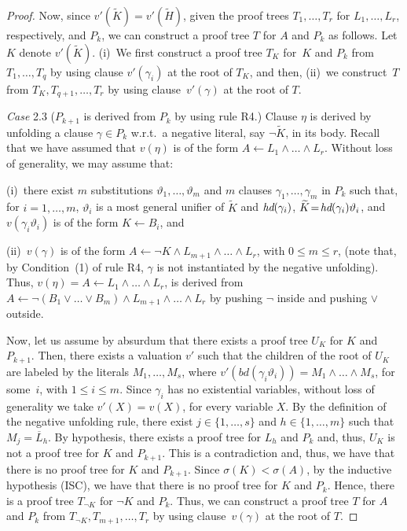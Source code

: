 \documentclass[english]{tlp}
\newcommand{\tH}{{\widetilde{H}}}
\newcommand{\tK}{{\widetilde{K}}}
\renewcommand{\mathit}{\displaystyle}
\newcommand{\Mathit}[1]{\mbox{\it #1}}
\begin{document}
\begin{proof}
Now, since $v'(\tK)\!=\!v'(\tH)$, given the proof trees 
$T_1,\ldots,T_r$ for $L_1,\ldots,L_r$, respectively, and $P_k$,
we can construct a proof tree $T$ for $A$ and $ P_k$ as follows.
Let $K$ denote $v'(\tK)$.
(i)~We first construct a proof tree $T_K$ for~$K$
 and $ P_k$ from $T_1,\ldots,T_q$ by using clause $v'(\gamma_i)$ at the root of $T_K$, and then,
(ii)~we construct~$T$ from $T_K,T_{q+1},\ldots,T_r$
by using clause~$v'(\gamma)$ at the root of $T$.

\medskip 

\noindent \emph{Case} 2.3 ($P_{k+1}$ is derived from $P_k$ by using
rule R4.)  Clause \( \eta  \) is derived by unfolding a clause
$\gamma\in  P_k$ w.r.t.~a negative literal, say $\neg \tK$, in its body. Recall that we have assumed that $v(\eta)$ is of the form $A
\leftarrow  L_{1} \wedge \ldots \wedge L_r$. Without loss
of generality, we may assume that: 

\noindent
(i)~there exist $m$ 
substitutions $\vartheta_1,\ldots,\vartheta_m$ and $m$ clauses $\gamma_1,\ldots,\gamma_m$ in $
P_k$ such that, for $i=1,\ldots,m$, $\vartheta_i$ is a most general
unifier of $\tK$ and $\Mathit{hd}(\gamma_i)$, $\tK\!=\!\Mathit{hd}(\gamma_i)\vartheta_i$,
and $v(\gamma_i\vartheta_i)$ is of the form
$K\leftarrow B_i$, and

\noindent
(ii)~$v(\gamma)$ is of the form $A
\leftarrow \neg K \wedge L_{m+1} \wedge \ldots \wedge L_r$, with
$0\leq m\leq r$, (note that, by Condition~(1) of rule R4, $\gamma$ is not
instantiated by the negative unfolding).
Thus, $v(\eta)=A
\leftarrow  L_{1} \wedge \ldots \wedge L_r$,  is derived 
from $A
\leftarrow \neg (B_1\vee \ldots \vee B_m) \wedge L_{m+1} \wedge \ldots \wedge L_r$
by pushing $\neg$ inside and pushing $\vee$ outside.


Now, let us assume by absurdum that there exists a proof tree $U_K$ for
$K$ and $P_{k+1}$. Then, there exists a valuation $v'$ such that the children of
the root of $U_K$ are labeled by the literals $M_1,\ldots,M_s$, where
$v'(\mathit{bd}(\gamma_i\vartheta_i))=M_1\wedge\ldots\wedge M_s$, for
some~$i$, with $1\leq i\leq m$. Since $\gamma_i$ has no existential variables, without 
loss of generality we take $v'(X)=v(X)$, for every variable $X$. 
By the definition of the negative unfolding rule, 
there exist $j\in\{1,\ldots,s\}$ and $h\in\{1,\ldots,m\}$ such that $M_j=\overline L_h$.
By hypothesis, there exists a proof tree for $L_h$ and $P_k$ and, thus, $U_K$
is not a proof tree for $K$ and $P_{k+1}$. This is a contradiction and, thus, we have that
there is no proof tree for $K$ and $P_{k+1}$. Since $\sigma(K)<\sigma(A)$, by
the inductive hypothesis (ISC), we have that there is no proof tree for
$K$ and $ P_k$. Hence, there is a proof tree $T_{\neg K}$ for
$\neg K$ and $ P_{k}$. Thus, we can construct a proof tree $T$ for $A$
and $ P_k$ from $T_{\neg K}, T_{m+1},\ldots,T_r$ by using clause~$v(\gamma)$ at the root of $T$.


\end{proof}
\end{document}
